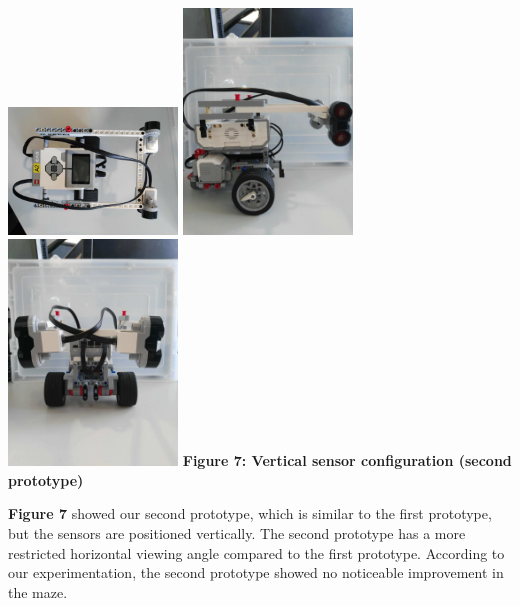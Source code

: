 \documentclass[hidelinks,a4paper,11pt]{article}
\begin{document}
\begin{mdframed}
\begin{center}
\includegraphics[angle=90, width=4.5cm]{vertical1.jpg}
\includegraphics[width=4.5cm]{vertical2.jpg}
\includegraphics[width=4.5cm]{vertical3.jpg}
\textbf{Figure 7: Vertical sensor configuration (second prototype)}
\end{center}
\textbf{Figure 7} showed our second prototype, which is similar to the first prototype, but the
sensors are positioned vertically. The second prototype has a more restricted horizontal viewing
angle compared to the first prototype. According to our experimentation, the second prototype showed
no noticeable improvement in the maze.
\end{mdframed}
\vspace*{\baselineskip}
\end{document}
